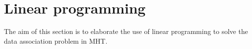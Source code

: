\section{Linear programming}
The aim of this section is to elaborate the use of linear programming to solve the data association problem in MHT.